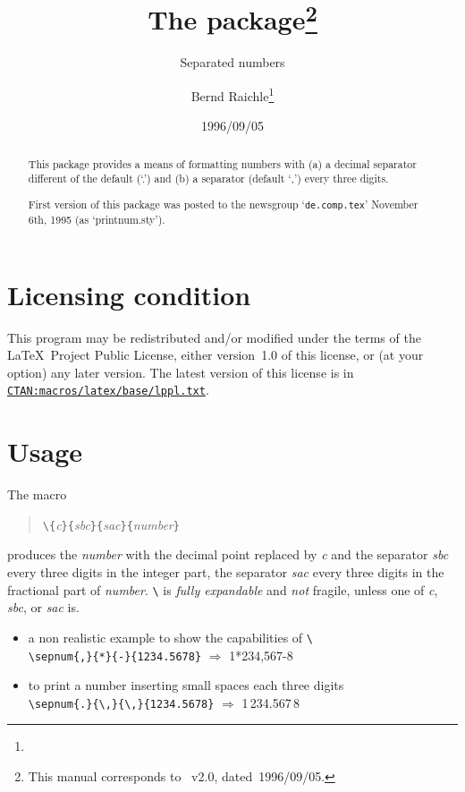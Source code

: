 \documentclass[pagesize=auto, fontsize=12pt, DIV=11, parskip=half]{scrartcl}
\title{The \pkg{sepnum} package\thanks{This manual corresponds to \pkg{sepnum}~v2.0, dated~1996/09/05.}}
\subtitle{Separated numbers}
\author{Bernd Raichle\thanks{\mail{Raichle@Informatik.Uni-Stuttgart.de}}}
\date{1996/09/05}
\makeatletter
\newcommand*{\pkg}[1]{\textsf{#1}}
\newcommand*{\cs}[1]{\texttt{\textbackslash#1}}
\newcommand*{\cmd}[1]{\cs{\expandafter\@gobble\string#1}}
\newcommand*{\meta}[1]{\textlangle\textsl{#1}\textrangle}
\newcommand*{\marg}[1]{\texttt{\{}\meta{#1}\texttt{\}}}
\makeatother
\begin{document}
\maketitle

\begin{abstract}
  \noindent
  This package provides a means of formatting numbers
  with (a) a decimal separator different of the default (`.')
  and (b) a separator (default `,') every three digits.

  First version of this package was posted to the newsgroup
  `\texttt{de.comp.tex}' November 6th, 1995 (as `\pkg{printnum.sty}').
\end{abstract}


\section{Licensing condition}

This program may be redistributed and/or modified under the terms
of the \LaTeX\ Project Public License, either version~1.0 of this
license, or (at your option) any later version.
The latest version of this license is in \href{http://ctan.org/macros/latex/base/lppl.txt}{\texttt{CTAN:macros/latex/base/lppl.txt}}.


\section{Usage}

The macro
%
\begin{quote}
  \cmd{\sepnum}\marg{c}\marg{sbc}\marg{sac}\marg{number}
\end{quote}
%
produces the \meta{number} with the decimal point replaced by \meta{c}
and the separator \meta{sbc} every three digits in the integer part,
the separator \meta{sac} every three digits in the fractional part
of \meta{number}.  \cmd{\sepnum} is \emph{fully expandable} and \emph{not} fragile,
unless one of \meta{c}, \meta{sbc}, or \meta{sac} is.

%
\begin{itemize}
\item a non realistic example to show the capabilities of \cmd{\sepnum} \\
  \verb|\sepnum{,}{*}{-}{1234.5678}| $\Rightarrow$ 1*234,567-8
\item to print a number inserting small spaces each three digits \\
  \verb|\sepnum{.}{\,}{\,}{1234.5678}| $\Rightarrow$ 1\,234.567\,8
\end{itemize}
\end{document}
